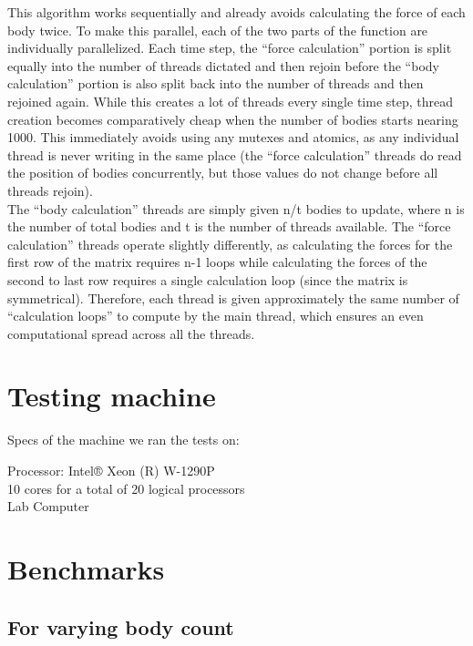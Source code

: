 \documentclass{article}
\begin{document}
This algorithm works sequentially and already avoids calculating the force of each body twice. To make this parallel, each of the two parts of the function are individually parallelized. Each time step, the “force calculation” portion is split equally into the number of threads dictated and then rejoin before the “body calculation” portion is also split back into the number of threads and then rejoined again. While this creates a lot of threads every single time step, thread creation becomes comparatively cheap when the number of bodies starts nearing 1000. This immediately avoids using any mutexes and atomics, as any individual thread is never writing in the same place (the “force calculation” threads do read the position of bodies concurrently, but those values do not change before all threads rejoin).\\

The “body calculation” threads are simply given n/t bodies to update, where n is the number of total bodies and t is the number of threads available. The “force calculation” threads operate slightly differently, as calculating the forces for the first row of the matrix requires n-1 loops while calculating the forces of the second to last row requires a single calculation loop (since the matrix is symmetrical). Therefore, each thread is given approximately the same number of “calculation loops” to compute by the main thread, which ensures an even computational spread across all the threads.

\section{Testing machine}
Specs of the machine we ran the tests on:

Processor: Intel® Xeon (R) W-1290P\\
10 cores for a total of 20 logical processors\\
Lab Computer

\newpage
\section{Benchmarks}
\subsection{For varying body count}
\end{document}
